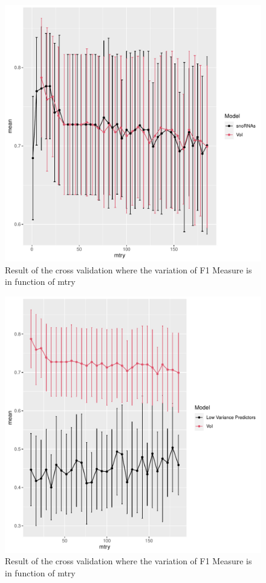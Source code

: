 \documentclass[journal]{IEEEtran}
\begin{document}
\begin{figure}[!ht]
    \centering
    \includegraphics[width=.8\linewidth]{images/snornas_vs_voi.pdf}
    \caption{Result of the cross validation where the variation of F1 Measure is in function of mtry}\label{fig:snorsas_vs_roi}
\end{figure}

\begin{figure}[!ht]
    \centering
    \includegraphics[width=.8\linewidth]{images/comparison_rfs.pdf}
    \caption{Result of the cross validation where the variation of F1 Measure is in function of mtry}\label{fig:comparison_rfs}
\end{figure}
\end{document}
